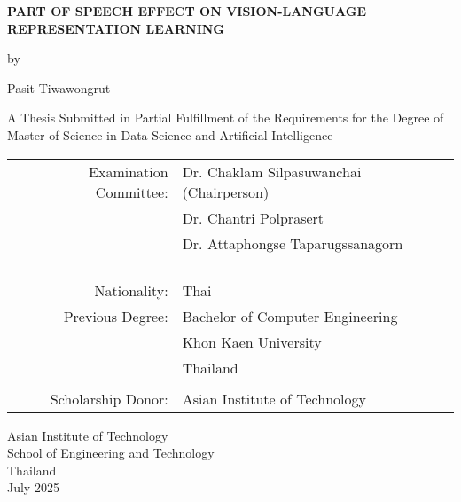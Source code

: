 
\begin{titlepage}
  \begin{center}
   
  \textbf{\large{ PART OF SPEECH EFFECT ON VISION-LANGUAGE REPRESENTATION LEARNING }}

  \vspace{3em} %
  
  by
  
  \vspace{3em} %
  
  Pasit Tiwawongrut
  
  \vspace{4em} %

  A Thesis Submitted in Partial Fulfillment of the Requirements for the Degree of Master of Science in Data Science and Artificial Intelligence

  \vspace{4em} %

\begin{center}
  \begin{tabular}{ rl }
Examination Committee: & Dr. Chaklam Silpasuwanchai (Chairperson)\\
                       & Dr. Chantri Polprasert \\
                       & Dr. Attaphongse Taparugssanagorn \\\\
                       
\\ \\ \\
Nationality:     & Thai \\
Previous Degree: & Bachelor of Computer Engineering \\
                 & Khon Kaen University \\
                 & Thailand \\
\\
Scholarship Donor: & Asian Institute of Technology
  \end{tabular}
\end{center}

\vspace{3em}

Asian Institute of Technology \\
School of Engineering and Technology \\
Thailand \\           
July 2025


  \end{center}
\end{titlepage}
